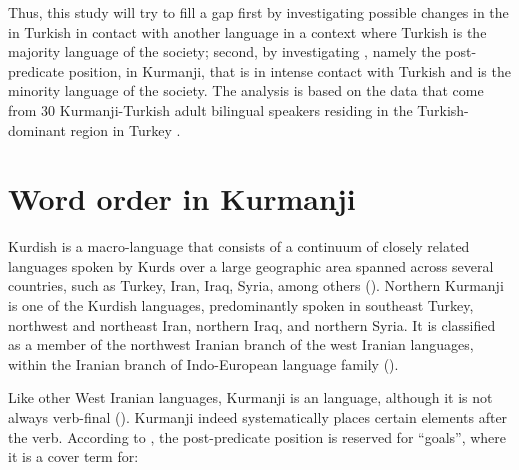 \documentclass[output=paper,colorlinks,citecolor=brown]{langscibook}
\begin{document}
Thus, this study will try to fill a gap first by investigating possible changes in the  in Turkish in contact with another language in a context where Turkish is the majority language of the society; second, by investigating , namely the post-predicate position, in Kurmanji, that is in intense contact with Turkish and is the minority language of the society. The analysis is based on the data that come from 30 Kurmanji-Turkish adult bilingual speakers residing in the Turkish-dominant region in Turkey \citep{iefremenko2021KurdishAnkara,iefremenko2021oghuz}.

\section{Word order in Kurmanji}\label{bilingual:ss:2}

Kurdish is a macro-language that consists of a continuum of closely related languages spoken by Kurds over a large geographic area spanned across several countries, such as Turkey, Iran, Iraq, Syria, among others (\citealt{sheyholislami2015language}). Northern Kurmanji is one of the Kurdish languages, predominantly spoken in southeast Turkey, northwest and northeast Iran, northern Iraq, and northern Syria. It is classified as a member of the northwest Iranian branch of the west Iranian languages, within the Iranian branch of Indo-European language family (\citealt{haigMatras2002kurdish}). 

Like other West Iranian languages, Kurmanji is an  language, although it is not always verb-final (\citealt{haig_verb-goal_2015}). Kurmanji indeed systematically places certain elements after the verb. According to \citet{haig_post-predicate_2014}, the post-predicate position is reserved for ``goals”, where it is a cover term for:
\end{document}
